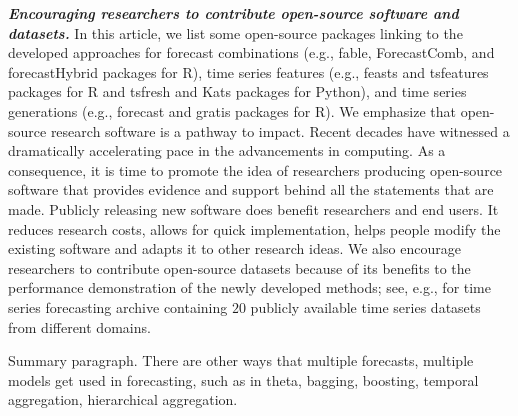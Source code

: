 \documentclass[11pt]{article}
\newcommand{\pkg}[1]{{\normalfont\fontseries{b}\selectfont #1}}
\let\proglang=\textsf
\begin{document}
\textbf{\textit{Encouraging researchers to contribute open-source software and datasets.}} In this article, we list some open-source packages linking to the developed approaches for forecast combinations (e.g., \pkg{fable}, \pkg{ForecastComb}, and \pkg{forecastHybrid} packages for \proglang{R}), time series features (e.g., \pkg{feasts} and \pkg{tsfeatures} packages for \proglang{R} and \pkg{tsfresh} and \pkg{Kats} packages for \proglang{Python}), and time series generations (e.g., \pkg{forecast} and \pkg{gratis} packages for \proglang{R}). We emphasize that open-source research software is a pathway to impact. Recent decades have witnessed a dramatically accelerating pace in the advancements in computing. As a consequence, it is time to promote the idea of researchers producing open-source software that provides evidence and support behind all the statements that are made. Publicly releasing new software does benefit researchers and end users. It reduces research costs, allows for quick implementation, helps people modify the existing software and adapts it to other research ideas. We also encourage researchers to contribute open-source datasets because of its benefits to the performance demonstration of the newly developed methods; see, e.g., \cite{Godahewa2021-mo,Godahewa2021-wb} for time series forecasting archive containing $20$ publicly available time series datasets from different domains.

Summary paragraph. {\color{red}There are other ways that multiple forecasts, multiple models get used in forecasting, such as in theta, bagging, boosting, temporal aggregation, hierarchical aggregation.}





\end{document}
